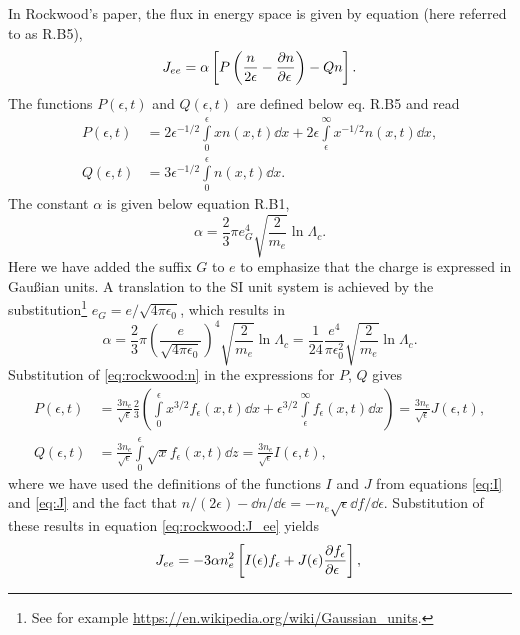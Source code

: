 \documentclass{book}
\begin{document}
In Rockwood's paper, the flux in energy space is given by equation
\cite[eq. B5]{Rockwood1973} (here referred to as R.B5),
\begin{equation}
	J_{ee}
	= \alpha\left[P\left(\frac{n}{2\epsilon}-\PDEV{n}{\epsilon}\right) - Qn\right].
	\label{eq:rockwood:J_ee}
\end{equation}
The functions $P(\epsilon,t)$ and $Q(\epsilon,t)$ are defined below eq. R.B5 and read
\begin{align}
  P(\epsilon,t) &= 2\epsilon^{-1/2}\int\limits_0^\epsilon xn(x,t)\dd{x} + 2\epsilon\int\limits_\epsilon^\infty x^{-1/2}n(x,t)\dd{x}, \\
  Q(\epsilon,t) &= 3\epsilon^{-1/2}\int\limits_0^\epsilon  n(x,t)\dd{x}.
\end{align}
The constant $\alpha$ is given below equation R.B1,
\begin{equation}
	\alpha = \frac{2}{3}\pi e_G^4\sqrt{\frac{2}{m_e}}\ln\Lambda_c.
\end{equation}
Here we have added the suffix $G$ to $e$ to emphasize that the charge is expressed in
Gau\ss ian units. A translation to the SI unit system is achieved by the
substitution\footnote{See for example \url{https://en.wikipedia.org/wiki/Gaussian_units}.}
$e_G = e/\sqrt{4\pi\epsilon_0}$, which results in
\begin{equation}
	\alpha
	= \frac{2}{3}\pi \left(\frac{e}{\sqrt{4\pi\epsilon_0}}\right)^4\sqrt{\frac{2}{m_e}}\ln\Lambda_c
	= \frac{1}{24}\frac{e^4}{\pi\epsilon_0^2}\sqrt{\frac{2}{m_e}}\ln\Lambda_c.
\end{equation}
Substitution of \eqref{eq:rockwood:n} in the expressions for $P$, $Q$ gives
\begin{align}
  P(\epsilon,t)
	&= \frac{3n_e}{\sqrt{\epsilon}}\frac{2}{3}\left(\int\limits_0^\epsilon x^{3/2}f_\epsilon(x,t)\dd{x} + \epsilon^{3/2}\int\limits_\epsilon^\infty f_\epsilon(x,t)\dd{x}\right)
	= \frac{3n_e}{\sqrt{\epsilon}}J(\epsilon,t), \\
  Q(\epsilon,t)
	&= \frac{3n_e}{\sqrt{\epsilon}}\int\limits_0^\epsilon  \sqrt{x}f_\epsilon(x,t)\dd{z}
	= \frac{3n_e}{\sqrt{\epsilon}}I(\epsilon,t),
\end{align}
where we have used the definitions of the functions $I$ and $J$ from equations \eqref{eq:I} and \eqref{eq:J}
and the fact that $n/(2\epsilon)-\dd{n}/\dd{\epsilon}=-n_e\sqrt{\epsilon}\dd{f}/\dd{\epsilon}$.
Substitution of these results in equation \eqref{eq:rockwood:J_ee} yields
\begin{equation}
  J_{ee} = -3\alpha n_e^2\left[I(\epsilon)f_\epsilon + J(\epsilon)\PDEV{f_\epsilon}{\epsilon}\right], \\
\end{equation}
\end{document}
